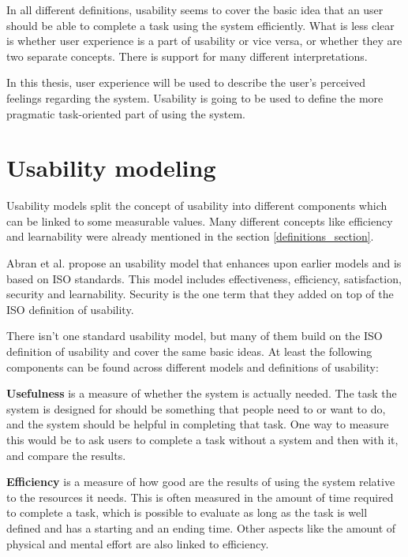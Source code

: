 In all different definitions, usability seems to cover the basic idea that an user should be able to complete a task using the system efficiently. What is less clear is whether user experience is a part of usability or vice versa, or whether they are two separate concepts. There is support for many different interpretations.

In this thesis, user experience will be used to describe the user's perceived feelings regarding the system. Usability is going to be used to define the more pragmatic task-oriented part of using the system.


\section{Usability modeling}\label{usability_attributes}
Usability models split the concept of usability into different components which can be linked to some measurable values. Many different concepts like efficiency and learnability were already mentioned in the section \ref{definitions_section}.

Abran et al. \cite{abran2003usability} propose an usability model that enhances upon earlier models and is based on ISO standards. This model includes effectiveness, efficiency, satisfaction, security and learnability. Security is the one term that they added on top of the ISO definition of usability.

There isn't one standard usability model, but many of them build on the ISO definition of usability and cover the same basic ideas. At least the following components can be found across different models and definitions of usability:

\textbf{Usefulness} is a measure of whether the system is actually needed. The task the system is designed for should be something that people need to or want to do, and the system should be helpful in completing that task. One way to measure this would be to ask users to complete a task without a system and then with it, and compare the results. \cite{albert2013measuring, rubin2008handbook}

\textbf{Efficiency} is a measure of how good are the results of using the system relative to the resources it needs. This is often measured in the amount of time required to complete a task, which is possible to evaluate as long as the task is well defined and has a starting and an ending time. Other aspects like the amount of physical and mental effort are also linked to efficiency. \cite{albert2013measuring, rubin2008handbook}

